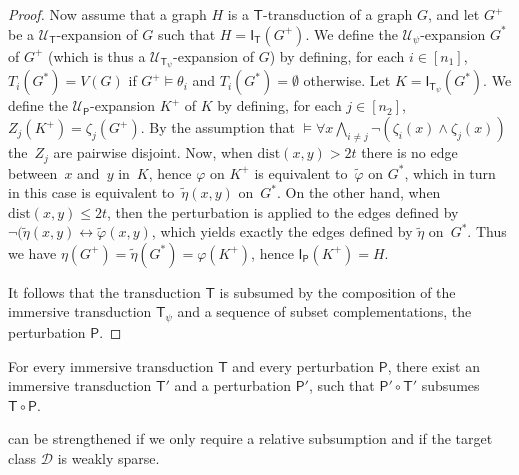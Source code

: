\documentclass{lmcs}
\newcommand{\Dd}{\mathscr{D}}
\newcommand{\dist}{\mathrm{dist}}
\renewcommand{\phi}{\varphi}
\theoremstyle{definition}
\begin{document}
\begin{proof}
	

	Now assume that a graph $H$ is a $\mathsf T$-transduction of a graph $G$, and let $G^+$ be a \mbox{${\mathcal U}_{\mathsf T}$-expansion} of $G$ such that $H=\mathsf I_{\mathsf T}(G^+)$.
	We define the ${\mathcal U}_\psi$-expansion $G^*$ of $G^+$ (which is thus a ${\mathcal U}_{\mathsf T_{\psi}}$-expansion of $G$)
	by defining, for each $i\in[n_1]$, $T_i(G^*)=V(G)$ if
	$G^+\models \theta_i$ and $T_i(G^*)=\emptyset$ otherwise.
	Let $K=\mathsf I_{\mathsf T_\psi}(G^*)$. We define the ${\mathcal U}_{\mathsf P}$-expansion $K^+$ of $K$ by defining, for each $j\in [n_2]$, 
	$Z_j(K^+)=\zeta_j(G^+)$. By the assumption that $\models \forall x \bigwedge_{i\neq j} \neg(\zeta_i(x)\wedge
	\zeta_j(x))$ the~$Z_j$ are pairwise disjoint. 
	Now, when $\dist(x,y)>2t$ there is no edge between~$x$ and~$y$ in~$K$, 
	hence $\phi$ on $K^+$ is equivalent to~$\widetilde{\phi}$ on $G^*$, which 
	in turn in this case is equivalent to~$\widetilde{\eta}(x,y)$ on~$G^*$. 
	On the other hand, when $\dist(x,y)\leq 2t$, then the perturbation 
	is applied to the edges defined by $\neg(\widetilde{\eta}(x,y)\leftrightarrow\widetilde{\phi}(x,y)$, which yields exactly the edges defined by $\widetilde{\eta}$
	on~$G^*$. Thus we have $\eta(G^+)=\widetilde{\eta}(G^*)=\phi(K^+)$, 
	hence    $\mathsf I_{\mathsf P}(K^+)=H$.
	
	
	It follows that the transduction $\mathsf T$ is subsumed by the composition
	of the immersive transduction $\mathsf T_\psi$ and a sequence of 
	subset complementations, the perturbation $\mathsf P$.
\end{proof}


\begin{cor}
	\label{cor:norm}
	For every immersive transduction $\mathsf T$ and every perturbation $\mathsf P$, there exist
	an immersive transduction $\mathsf T'$ and a perturbation $\mathsf P'$, such that 
	$\mathsf P'\circ\mathsf T'$ subsumes $\mathsf T\circ\mathsf P$.
\end{cor}

 can be strengthened if we only require a relative subsumption and if the target class $\Dd$ is weakly sparse.
\end{document}
